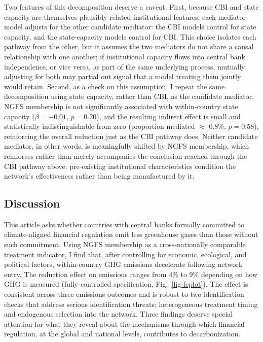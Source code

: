 \documentclass[
  12pt,
  letterpaper,
]{article}
\begin{document}
Two features of this decomposition deserve a caveat. First, because CBI
and state capacity are themselves plausibly related institutional
features, each mediator model adjusts for the other candidate mediator:
the CBI models control for state capacity, and the state-capacity models
control for CBI. This choice isolates each pathway from the other, but
it assumes the two mediators do not share a causal relationship with one
another; if institutional capacity flows into central bank independence,
or vice versa, as part of the same underlying process, mutually
adjusting for both may partial out signal that a model treating them
jointly would retain. Second, as a check on this assumption, I repeat
the same decomposition using state capacity, rather than CBI, as the
candidate mediator. NGFS membership is not significantly associated with
within-country state capacity (\(\beta = -0.01\), \(p = 0.20\)), and the
resulting indirect effect is small and statistically indistinguishable
from zero (proportion mediated \(\approx\) 0.8\%, \(p = 0.58\)),
reinforcing the overall reduction just as the CBI pathway does. Neither
candidate mediator, in other words, is meaningfully shifted by NGFS
membership, which reinforces rather than merely accompanies the
conclusion reached through the CBI pathway above: pre-existing
institutional characteristics condition the network's effectiveness
rather than being manufactured by it.

\subsection{Discussion}\label{discussion}

This article asks whether countries with central banks formally
committed to climate-aligned financial regulation emit less greenhouse
gases than those without such commitment. Using NGFS membership as a
cross-nationally comparable treatment indicator, I find that, after
controlling for economic, ecological, and political factors,
within-country GHG emissions decelerate following network entry. The
reduction effect on emissions ranges from 4\% to 9\% depending on how
GHG is measured (fully-controlled specification, Fig.~\ref{fig-feplot}).
The effect is consistent across three emissions outcomes and is robust
to two identification checks that address serious identification
threats: heterogeneous treatment timing and endogenous selection into
the network. Three findings deserve special attention for what they
reveal about the mechanisms through which financial regulation, at the
global and national levels, contributes to decarbonization.
\end{document}
